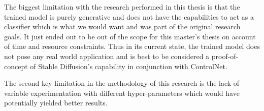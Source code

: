 The biggest limitation with the research performed in this thesis is that the trained model is purely generative and does not have the capabilities to act as a classifier which is what we would want and was part of the original research goals. It just ended out to be out of the scope for this master's thesis on account of time and resource constraints. Thus in its current state, the trained model does not pose any real world application and is best to be considered a proof-of-concept of Stable Diffusion's capability in conjunction with ControlNet. 

The second key limitation in the methodology of this research is the lack of variable experimentation with different hyper-parameters which would have potentially yielded better results.


